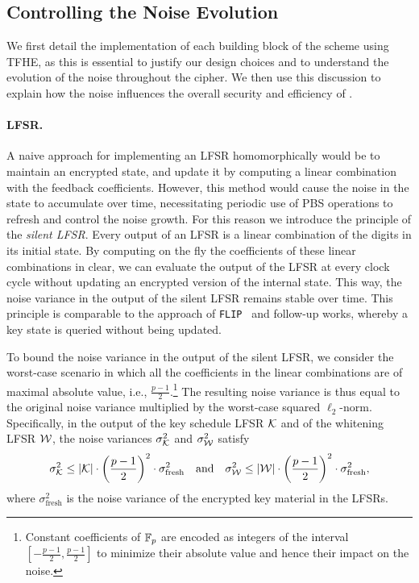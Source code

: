 
\subsection{Controlling the Noise Evolution}%
\label{sec:rationale-controllin-noise}

We first detail the implementation of each building block of the scheme using TFHE, as this is essential to justify our design choices and to understand the evolution of the noise throughout the cipher. We then use this discussion to explain how the noise influences the overall security and efficiency of \coolName.

\paragraph{LFSR.} A naive approach for implementing an LFSR  homomorphically would be to maintain an encrypted state, and update it by computing a linear combination with the feedback coefficients. However, this method would cause the noise in the state to accumulate over time, necessitating periodic use of PBS operations to refresh and control the noise growth. For this reason we introduce the principle of the \emph{silent LFSR}. Every output of an LFSR is a linear combination of the digits in its initial state. By computing on the fly the coefficients of these linear combinations in clear, we can evaluate the output of the LFSR at every clock cycle without updating an encrypted version of the internal state. This way, the noise variance in the output of the silent LFSR remains stable over time. This principle is comparable to the approach of {\tt FLIP}~\cite{EC:MJSC16} and follow-up works, whereby a key state is queried without being updated. 

To bound the noise variance in the output of the silent LFSR, we consider the worst-case scenario in which all the coefficients in the linear combinations are of maximal absolute value, i.e., $\frac{p-1}{2}$.\footnote{Constant coefficients of $\mathbb{F}_{p}$ are encoded as integers of the interval $[-\frac{p-1}{2}, \frac{p-1}{2}]$ to minimize their absolute value and hence their impact on the noise.} The resulting noise variance is thus equal to the original noise variance multiplied by the worst-case squared $\ell_2$-norm. Specifically, in the output of the key schedule LFSR $\mathcal{K}$ and of the whitening LFSR $\mathcal{W}$, the noise variances $\sigma_{\mathcal{K}}^2$ and $\sigma_{\mathcal{W}}^2$ satisfy
\begin{equation}
  \sigma_{\mathcal{K}}^2 \leq | \mathcal{K} | \cdot \left(\frac{p-1}2\right)^2 \cdot \sigma_{\text{fresh}}^2 ~~~\text{and}~~~ \sigma_{\mathcal{W}}^2 \leq | \mathcal{W} | \cdot \left(\frac{p-1}2\right)^2 \cdot \sigma_{\text{fresh}}^2,
\end{equation}
where $\sigma_{\text{fresh}}^2$ is the noise variance of the encrypted key material in the LFSRs.


